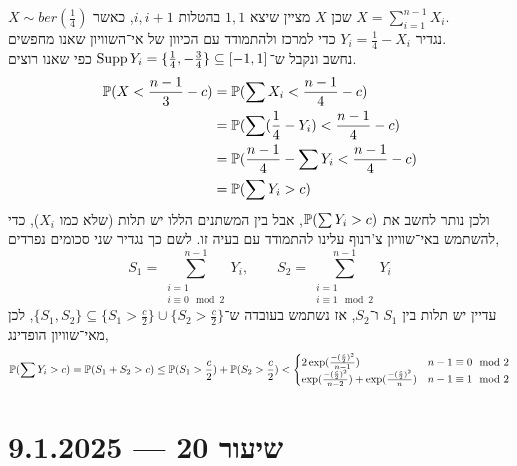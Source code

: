 \begin{solution}
	$X \sim ber(\frac{1}{4})$ שכן $X$ מציין שיצא $1, 1$ בהטלות $i, i + 1$, כאשר $X = \sum_{i = 1}^{n - 1} X_i$. \\
	נגדיר $Y_i = \frac{1}{4} - X_i$ כדי למרכז ולהתמודד עם הכיוון של אי־השוויון שאנו מחפשים. \\
	נחשב ונקבל ש־$\operatorname{Supp} Y_i = \{\frac{1}{4}, - \frac{3}{4} \} \subseteq [-1, 1]$ כפי שאנו רוצים.
	\begin{align*}
		\mathbb{P}(X < \frac{n - 1}{3} - c)
		& = \mathbb{P}( \sum X_i < \frac{n - 1}{4} - c) \\
		& = \mathbb{P}(\sum(\frac{1}{4} - Y_i) < \frac{n - 1}{4} - c) \\
		& = \mathbb{P}(\frac{n - 1}{4} - \sum Y_i < \frac{n - 1}{4} - c) \\
		& = \mathbb{P}(\sum Y_i > c)
	\end{align*}
	ולכן נותר לחשב את $\mathbb{P}(\sum Y_i > c)$, אבל בין המשתנים הללו יש תלות (שלא כמו $X_i$), כדי להשתמש באי־שוויון צ'רנוף עלינו להתמודד עם בעיה זו.
	לשם כך נגדיר שני סכומים נפרדים,
	\[
		S_1 = \sum_{\substack{i = 1 \\ i \equiv 0 \mod 2}}^{n - 1} Y_i,
		\qquad
		S_2 = \sum_{\substack{i = 1 \\ i \equiv 1 \mod 2}}^{n - 1} Y_i
	\]
	עדיין יש תלות בין $S_1$ ו־$S_2$, אז נשתמש בעובדה ש־$\{S_1, S_2\} \subseteq \{ S_1 > \frac{c}{2} \} \cup \{ S_2 > \frac{c}{2} \}$, לכן מאי־שוויון הופדינג,
	\[
		\mathbb{P}(\sum Y_i > c)
		= \mathbb{P}(S_1 + S_2 > c)
		\le \mathbb{P}(S_1 > \frac{c}{2}) + \mathbb{P}(S_2 > \frac{c}{2})
		< \begin{cases}
			2\exp(\frac{- {(\frac{c}{2})}^2}{n - 1}) & n - 1 \equiv 0 \mod 2 \\
			\exp(\frac{- {(\frac{c}{2})}^2}{n - 2}) + \exp(\frac{- {(\frac{c}{2})}^2}{n}) & n - 1 \equiv 1 \mod 2
		\end{cases}
	\]
\end{solution}

\section{שיעור 20 --- 9.1.2025}
